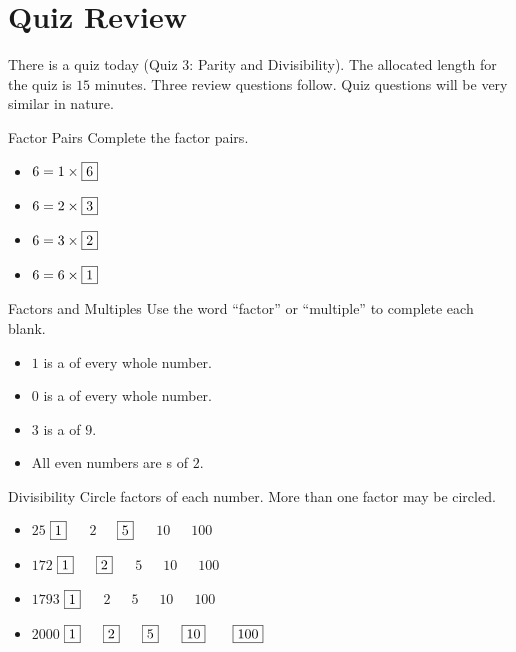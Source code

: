\documentclass[a4paper,10pt]{report}
\begin{document}
\section{Quiz Review}

There is a quiz today (Quiz 3: Parity and Divisibility). The allocated length
for the quiz is $15$ minutes. Three review questions follow. Quiz questions will
be very similar in nature.

\begin{problem}{Factor Pairs}
 Complete the factor pairs.

 \begin{itemize}
  \item $6 = 1 \times \Ans{6}$
  \item $6 = 2 \times \Ans{3}$
  \item $6 = 3 \times \Ans{2}$
  \item $6 = 6 \times \Ans{1}$
 \end{itemize}
\end{problem}

\begin{problem}{Factors and Multiples}
 Use the word ``factor'' or ``multiple'' to complete each blank.

 \begin{itemize}
  \item $1$ is a  of every whole number.
  \item $0$ is a  of every whole number.
  \item $3$ is a  of $9$.
  \item All even numbers are s of $2$.
 \end{itemize}
\end{problem}

\begin{problem}{Divisibility}
 Circle factors of each number. More than one factor may be circled.

 \begin{itemize}
  \item $25$ \hfill $\Ans{1}$~~~$2$~~~$\Ans{5}$~~~$10$~~~$100$
  \item $172$ \hfill $\Ans{1}$~~~$\Ans{2}$~~~$5$~~~$10$~~~$100$
  \item $1793$ \hfill $\Ans{1}$~~~$2$~~~$5$~~~$10$~~~$100$
  \item $2000$ \hfill $\Ans{1}$~~~$\Ans{2}$~~~$\Ans{5}$~~~$\Ans{10}$
  ~~~$\Ans{100}$
 \end{itemize}
\end{problem}
\end{document}
